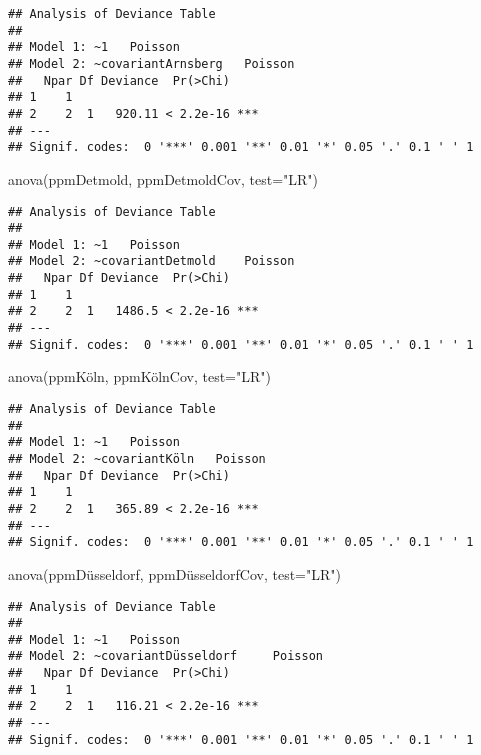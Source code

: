 \documentclass[
]{article}
\newenvironment{Shaded}{\begin{snugshade}}{\end{snugshade}}
\newcommand{\AttributeTok}[1]{\textcolor[rgb]{0.77,0.63,0.00}{#1}}
\newcommand{\FunctionTok}[1]{\textcolor[rgb]{0.00,0.00,0.00}{#1}}
\newcommand{\NormalTok}[1]{#1}
\newcommand{\StringTok}[1]{\textcolor[rgb]{0.31,0.60,0.02}{#1}}
\begin{document}
\begin{verbatim}
## Analysis of Deviance Table
## 
## Model 1: ~1   Poisson
## Model 2: ~covariantArnsberg   Poisson
##   Npar Df Deviance  Pr(>Chi)    
## 1    1                          
## 2    2  1   920.11 < 2.2e-16 ***
## ---
## Signif. codes:  0 '***' 0.001 '**' 0.01 '*' 0.05 '.' 0.1 ' ' 1
\end{verbatim}

\begin{Shaded}
\begin{Highlighting}[]
\FunctionTok{anova}\NormalTok{(ppmDetmold, ppmDetmoldCov, }\AttributeTok{test=}\StringTok{"LR"}\NormalTok{)}
\end{Highlighting}
\end{Shaded}

\begin{verbatim}
## Analysis of Deviance Table
## 
## Model 1: ~1   Poisson
## Model 2: ~covariantDetmold    Poisson
##   Npar Df Deviance  Pr(>Chi)    
## 1    1                          
## 2    2  1   1486.5 < 2.2e-16 ***
## ---
## Signif. codes:  0 '***' 0.001 '**' 0.01 '*' 0.05 '.' 0.1 ' ' 1
\end{verbatim}

\begin{Shaded}
\begin{Highlighting}[]
\FunctionTok{anova}\NormalTok{(ppmKöln, ppmKölnCov, }\AttributeTok{test=}\StringTok{"LR"}\NormalTok{)}
\end{Highlighting}
\end{Shaded}

\begin{verbatim}
## Analysis of Deviance Table
## 
## Model 1: ~1   Poisson
## Model 2: ~covariantKöln   Poisson
##   Npar Df Deviance  Pr(>Chi)    
## 1    1                          
## 2    2  1   365.89 < 2.2e-16 ***
## ---
## Signif. codes:  0 '***' 0.001 '**' 0.01 '*' 0.05 '.' 0.1 ' ' 1
\end{verbatim}

\begin{Shaded}
\begin{Highlighting}[]
\FunctionTok{anova}\NormalTok{(ppmDüsseldorf, ppmDüsseldorfCov, }\AttributeTok{test=}\StringTok{"LR"}\NormalTok{)}
\end{Highlighting}
\end{Shaded}

\begin{verbatim}
## Analysis of Deviance Table
## 
## Model 1: ~1   Poisson
## Model 2: ~covariantDüsseldorf     Poisson
##   Npar Df Deviance  Pr(>Chi)    
## 1    1                          
## 2    2  1   116.21 < 2.2e-16 ***
## ---
## Signif. codes:  0 '***' 0.001 '**' 0.01 '*' 0.05 '.' 0.1 ' ' 1
\end{verbatim}
\end{document}
